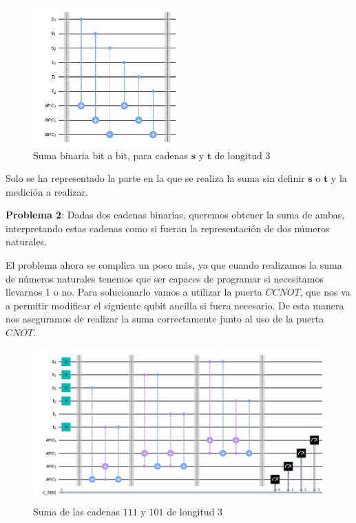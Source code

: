  \begin{figure}[H]
    \centering
    \includegraphics[width=0.5\textwidth]{TFG/imagenes/sumaBtB.png}
    \caption{Suma binaria bit a bit, para cadenas $\mathbf{s}$ y $\mathbf{t}$ de longitud 3} 
    \label{FIG:SumaBtB}
 \end{figure}

 Solo se ha representado la parte en la que se realiza la suma sin definir $\mathbf{s}$ o $\mathbf{t}$ y la medición a realizar. \newline

 \textbf{Problema 2}: Dadas dos cadenas binarias, queremos obtener la suma de ambas, interpretando estas cadenas como si fueran la representación de dos números naturales.\newline

 El problema ahora se complica un poco más, ya que cuando realizamos la suma de números naturales tenemos que ser capaces de programar si necesitamos llevarnos 1 o no. Para solucionarlo vamos a utilizar la puerta $CCNOT$, que nos va a permitir modificar el siguiente qubit ancilla si fuera necesario. De esta manera nos aseguramos de realizar la suma correctamente junto al uso de la puerta $CNOT$.

\begin{figure}[H]
    \centering
    \includegraphics[width=\textwidth]{TFG/imagenes/sumaNat.png}
    \caption{Suma de las cadenas $111$ y $101$ de longitud 3} 
    \label{FIG:SumaNat}
 \end{figure}

